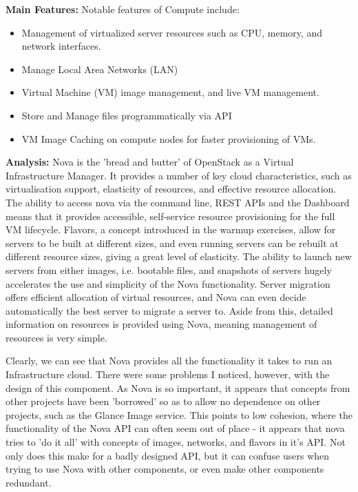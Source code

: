 \textbf{Main Features:} 
Notable features of Compute include\cite{openstackcompute}:
\begin{itemize}
\itemsep0em
\item Management of virtualized server resources such as
CPU, memory, and network interfaces.
\item Manage Local Area Networks (LAN)
\item Virtual Machine (VM) image management, and live VM management.
\item Store and Manage files programmatically via API
\item VM Image Caching on compute nodes for faster provisioning of VMs.
\end{itemize}

\textbf{Analysis: }
Nova is the 'bread and butter' of OpenStack as a Virtual Infrastructure Manager. It provides a number of key cloud characteristics, such as virtualisation support, elasticity of resources, and effective resource allocation. 
The ability to access nova via the command line, REST APIs and the Dashboard means that it provides accessible, self-service resource provisioning for the full VM lifecycle.  
Flavors, a concept introduced in the warmup exercises, allow for servers to be built at different sizes, and even running servers can be rebuilt at different resource sizes, giving a great level of elasticity. The ability to launch new servers from either images, i.e. bootable files, and snapshots of servers hugely accelerates the use and simplicity of the Nova functionality. Server migration offers efficient allocation of virtual resources, and Nova can even decide automatically the best server to migrate a server to. Aside from this, detailed information on resources is provided using Nova, meaning management of resources is very simple. 

Clearly, we can see that Nova provides all the functionality it takes to run an Infrastructure cloud. There were some problems I noticed, however, with the design of this component. As Nova is so important, it appears that concepts from other projects have been 'borrowed' so as to allow no dependence on other projects, such as the Glance Image service. This points to low cohesion, where the functionality of the Nova API can often seem out of place - it appears that nova tries to 'do it all' with concepts of images, networks, and flavors in it's API. Not only does this make for a badly designed API, but it can confuse users when trying to use Nova with other components, or even make other components redundant. 

